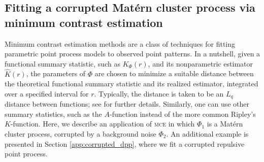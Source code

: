 \documentclass[11pt,a4paper,oneside]{article}
\newcommand{\dd}{\mathrm d}
\theoremstyle{definition}
\theoremstyle{remark}
\begin{document}
\subsection{Fitting a corrupted Mat\'ern cluster process via minimum contrast estimation} \label{sec:corrupted_Matern}

Minimum contrast estimation methods \citep[\textsc{mce},][]{MoWaBook03} are a class of techniques for fitting parametric point process models to observed point patterns.
In a nutshell, given a functional summary statistic, such as $K_{\Phi}(r)$, and its nonparametric estimator $\hat K(r)$, the parameters of $\Phi$ are chosen to minimize a suitable distance between the theoretical functional summary statistic and its realized estimator, integrated over a specified interval for $r$. Typically, the distance is taken to be an $L_q$ distance between functions; see \cite{diggle2013statistical} for further details. Similarly, one can use other summary statistics, such as the $A$-function instead of the more common Ripley's $K$-function.
Here,  we describe an application of \textsc{mce} in which $\Phi_1$ is a Mat\'ern cluster process, corrupted by a background noise $\Phi_2$. An additional example is presented in Section \ref{app:corrupted_dpp}, where we fit a corrupted repulsive point process.

\end{document}
